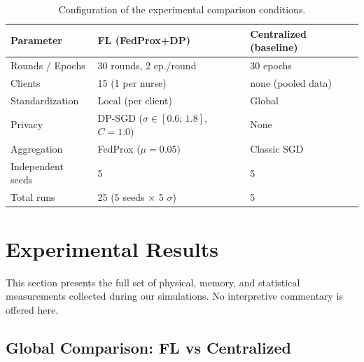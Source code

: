 \documentclass{article}
\begin{document}
\begin{table}[h!]
  \centering
  \caption{Configuration of the experimental comparison conditions.}
  \label{tab:exp_config}
  \begin{tabular}{lll}
    \toprule
    Parameter & FL (FedProx+DP) & Centralized (baseline) \\
    \midrule
    Rounds / Epochs  & 30 rounds, 2 ep./round & 30 epochs \\
    Clients          & 15 (1 per nurse)  & none (pooled data) \\
    Standardization  & Local (per client)    & Global \\
    Privacy          & DP-SGD ($\sigma \in [0.6;\, 1.8]$, $C=1.0$) & None \\
    Aggregation       & FedProx ($\mu=0.05$) & Classic SGD \\
    Independent seeds   & 5                      & 5 \\
    Total runs      & 25 (5 seeds $\times$ 5 $\sigma$) & 5 \\
    \bottomrule
  \end{tabular}
\end{table}

\section{Experimental Results}
\label{sec:results}

This section presents the full set of physical, memory, and statistical
measurements collected during our simulations. No interpretive commentary is
offered here.

\subsection{Global Comparison: FL vs Centralized}
\label{subsec:global_comparison}
\end{document}
